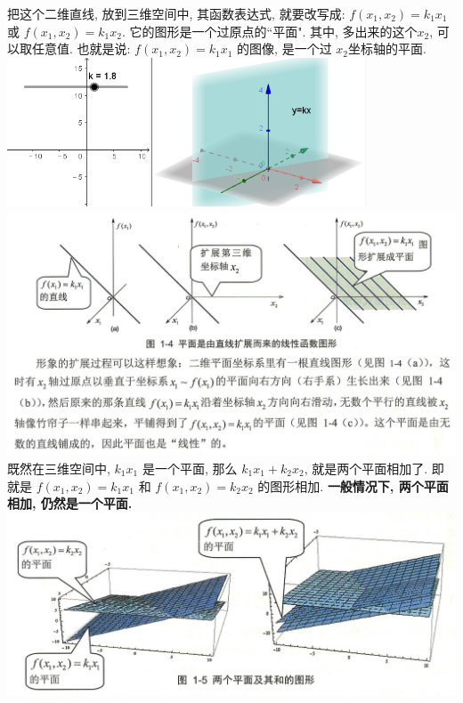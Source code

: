 \documentclass[UTF8]{ctexart}
\begin{document}
把这个二维直线, 放到三维空间中, 其函数表达式, 就要改写成: $f\left( x_1,x_2 \right) =k_1x_1$ 或 $f\left( x_1,x_2 \right) =k_1x_2$. 它的图形是一个过原点的``平面". 其中, 多出来的这个$x_2$, 可以取任意值. 也就是说:  $f\left( x_1,x_2 \right) =k_1x_1$ 的图像, 是一个过 $x_2$坐标轴的平面. \\

\includegraphics[width=0.8\textwidth]{img/0113.png}\\

\includegraphics[width=1\textwidth]{img/0114.png}\\

既然在三维空间中, $k_1 x_1$ 是一个平面, 那么 $k_1 x_1 +  k_2 x_2$, 就是两个平面相加了. 即就是 $f\left( x_1,x_2 \right) =k_1x_1$ 和 $f\left( x_1,x_2 \right) =k_2 x_2$ 的图形相加. \textbf{一般情况下, 两个平面相加, 仍然是一个平面.} \\

\includegraphics[width=1\textwidth]{img/0115.png}\\
\end{document}
